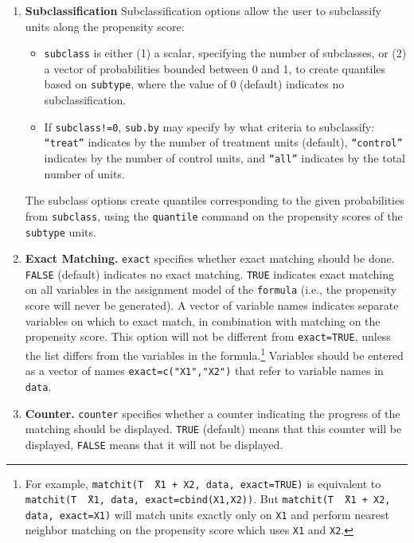 \documentclass[oneside,letterpaper,titlepage]{article}
\begin{document}
\begin{enumerate}
\item \textbf{Subclassification}
  Subclassification options allow the user to subclassify units along
  the propensity score:
  \begin{itemize}
  \item \texttt{subclass} is either (1) a scalar, specifying the
    number of subclasses, or (2) a vector of probabilities bounded
    between 0 and 1, to create quantiles based on \texttt{subtype},
    where the value of 0 (default) indicates no subclassification.
  \item If \texttt{subclass!=0}, \texttt{sub.by} may specify by what
    criteria to subclassify: \texttt{``treat''} indicates by the
    number of treatment units (default), \texttt{``control''}
    indicates by the number of control units, and \texttt{``all''}
    indicates by the total number of units.
  \end{itemize}
  The subclass options create quantiles corresponding to the given
  probabilities from \texttt{subclass}, using the \texttt{quantile}
  command on the propensity scores of the \texttt{subtype} units. 
  
\item \textbf{Exact Matching.}  \texttt{exact} specifies whether exact
  matching should be done.  \texttt{FALSE} (default) indicates no
  exact matching.  \texttt{TRUE} indicates exact matching on all
  variables in the assignment model of the \texttt{formula} (i.e., the
  propensity score will never be generated).  A vector of variable
  names indicates separate variables on which to exact match, in
  combination with matching on the propensity score.  This option will
  not be different from \texttt{exact=TRUE}, unless the list differs
  from the variables in the formula.\footnote{For example,
    \texttt{matchit(T \~\ X1 + X2, data, exact=TRUE)} is equivalent to
    \texttt{matchit(T \~\ X1, data, exact=cbind(X1,X2))}.  But
    \texttt{matchit(T \~\ X1 + X2, data, exact=X1)} will match units
    exactly only on \texttt{X1} and perform nearest neighbor matching
    on the propensity score which uses \texttt{X1} and \texttt{X2}.}
  Variables should be entered as a vector of names
  \texttt{exact=c("X1","X2")} that refer to variable names in
  \texttt{data}.
  
\item \textbf{Counter.} \texttt{counter} specifies whether a counter
  indicating the progress of the matching should be displayed.
  \texttt{TRUE} (default) means that this counter will be displayed,
  \texttt{FALSE} means that it will not be displayed.

\end{enumerate}
  
\end{document}
